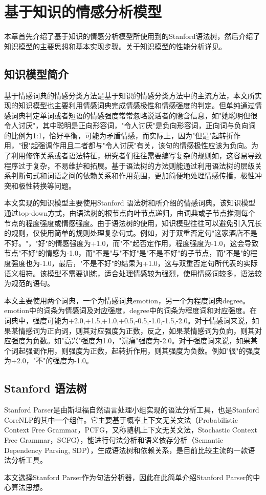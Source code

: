 \chapter{基于知识的情感分析模型}\thispagestyle{fancy}
本章首先介绍了基于知识的情感分析模型所使用到的Stanford语法树，然后介绍了知识模型的主要思想和基本实现步骤。关于知识模型的性能分析详见。
\section{知识模型简介}
基于情感词典的情感分类方法是基于知识的情感分类方法中的主流方法，本文所实现的知识模型也主要利用情感词典完成情感极性和情感强度的判定。但单纯通过情感词典判定单词或者短语的情感强度常常忽略说话者的隐含信息，如"她聪明但很令人讨厌"，其中聪明是正向形容词，"令人讨厌"是负向形容词，正向词与负向词的比例为1:1，恰好平衡，可能为矛盾情感，而实际上，因为"但是"起转折作用，"很"起强调作用且二者都与"令人讨厌"有关，该句的情感极性应该为负向。为了利用修饰关系或者语法特征，研究者们往往需要编写复杂的规则如\cite{Choi2008}，这容易导致程序过于复杂，不易维护和拓展。基于语法树的方法则能通过利用语法树的层级关系判断句式和词语之间的依赖关系和作用范围，更加简便地处理情感传播，极性冲突和极性转换等问题\cite{Moilanen2007}。


本文实现的知识模型主要使用Stanford 语法树和所介绍的情感词典。该知识模型通过top-down方式，由语法树的根节点向叶节点递归，由词典或子节点推测每个节点的程度强度或情感强度。由于语法树的使用，知识模型往往可以避免引入冗长的规则，仅使用简单的规则处理复杂句式。例如，对于双重否定句"这家酒店不是不好。"，"好"的情感强度为+1.0，而"不"起否定作用，程度强度为-1.0，这会导致节点"不好"的情感为-1.0，而"不是"与"不好"是"不是不好"的子节点，而"不是"的程度强度也为-1.0，最后，"不是不好"的结果为+1.0，这与双重否定句所代表的实际语义相符。该模型不需要训练，适合处理情感较为强烈，使用情感词较多，语法较为规范的语句。


本文主要使用两个词典，一个为情感词典emotion，另一个为程度词典degree。emotion中的词条为情感词及对应强度，degree中的词条为程度词和对应强度。在词典中，强度可能为+2.0,+1.5,+1.0,+0.5,-0.5,-1.0,-1.5,-2.0。对于情感词来说，如果某情感词为正向词，则其对应强度为正数，反之，如果某情感词为负向，则其对应强度为负数。如"高兴"强度为1.0，"沉痛"强度为-2.0。对于强度词来说，如果某个词起强调作用，则强度为正数，起转折作用，则其强度为负数。例如"很"的强度为+2.0，"不"的强度为-1.0。


\section{Stanford 语法树}
Stanford Parser是由斯坦福自然语言处理小组实现的语法分析工具，也是Stanford CoreNLP的其中一个组件。它主要基于概率上下文无关文法（Probabilistic Context Free Grammar，PCFG，又称随机上下文无关文法，Stochastic Context Free Grammar，SCFG），能进行句法分析和语义依存分析（Semantic Dependency Parsing, SDP），生成语法树和依赖关系，是目前比较主流的一款语法分析工具。\par
本文选择Stanford Parser作为句法分析器，因此在此简单介绍Stanford Parser的中心算法思想。\par

